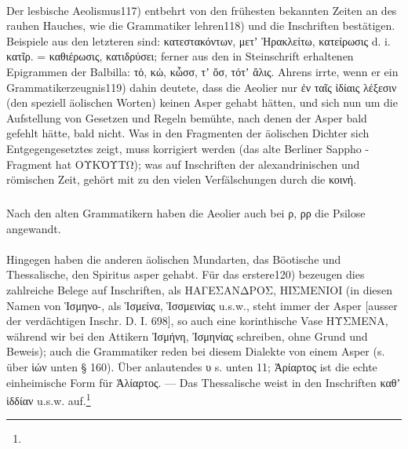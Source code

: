 \paragraph{} Der lesbische Aeolismus117) entbehrt von den frühesten bekannten
Zeiten an des rauhen Hauches, wie die Grammatiker lehren118) und die Inschriften
bestätigen. Beispiele aus den letzteren sind: κατεστακόντων, μετʼ Ἠρακλείτω,
κατείρωσις d. i. κατῖρ. = καθιέρωσις, κατιδρύσει; ferner aus den in Steinschrift
erhaltenen Epigrammen der Balbilla: τὀ, κὠ, κὦσσ, τʼ ὄσ, τότʼ ἄλις. Ahrens
irrte, wenn er ein Grammatikerzeugnis119) dahin deutete, dass die Aeolier nur ἐν
ταῖς ἰδίαις λέξεσιν (den speziell äolischen Worten) keinen Asper gehabt hätten,
und sich nun um die Aufstellung von Gesetzen und Regeln bemühte, nach denen der
Asper bald gefehlt hätte, bald nicht. Was in den Fragmenten der äolischen
Dichter sich Entgegengesetztes zeigt, muss korrigiert werden (das alte Berliner
Sappho - Fragment hat ΟΥΚὈΥΤΩ); was auf Inschriften der alexandrinischen und
römischen Zeit, gehört mit zu den vielen Verfälschungen durch die κοινή. 

{\small\noindent\subparagraph{} Nach den alten Grammatikern haben die Aeolier
auch bei ρ, ρρ die Psilose angewandt.}

\paragraph{} Hingegen haben die anderen äolischen Mundarten, das Böotische und
Thessalische, den Spiritus asper gehabt. Für das erstere120) bezeugen dies
zahlreiche Belege auf Inschriften, als ΗΑΓΕΣΑΝΔΡΟΣ, ΗΙΣΜΕΝΙΟΙ (in diesen Namen
von Ἱσμηνο-, als Ἱσμείνα, Ἱσσμεινίας u.s.w., steht immer der Asper [ausser der
verdächtigen Inschr. D. I. 698], so auch eine korinthische Vase ΗΥΣΜΕΝΑ, während
wir bei den Attikern Ἰσμήνη, Ἰσμηνίας schreiben, ohne Grund und Beweis); auch
die Grammatiker reden bei diesem Dialekte von einem Asper (s. über ἱών unten §
160). Über anlautendes υ s. unten 11; Ἀρίαρτος ist die echte einheimische Form
für Ἁλίαρτος. — Das Thessalische weist in den Inschriften καθʼ ἱδδίαν u.s.w.
auf.\footnote{} 

